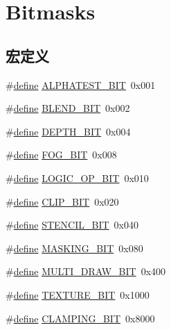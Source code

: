 \hypertarget{group___bitmasks}{}\section{Bitmasks}
\label{group___bitmasks}
\subsection*{宏定义}
\begin{DoxyCompactItemize}
\item 
\#\hyperlink{structdefine}{define} \hyperlink{group___bitmasks_ga92615fda58d9dd2b7ef1560e2be75f83}{A\+L\+P\+H\+A\+T\+E\+S\+T\+\_\+\+B\+IT}~0x001
\item 
\#\hyperlink{structdefine}{define} \hyperlink{group___bitmasks_ga75020080d440ecb465d8e2cbd7ba7e11}{B\+L\+E\+N\+D\+\_\+\+B\+IT}~0x002
\item 
\#\hyperlink{structdefine}{define} \hyperlink{group___bitmasks_gab09edfd3d45e7985cf9814658f1ab2b4}{D\+E\+P\+T\+H\+\_\+\+B\+IT}~0x004
\item 
\#\hyperlink{structdefine}{define} \hyperlink{group___bitmasks_ga5877c4822762ac53270b01b64abae8e8}{F\+O\+G\+\_\+\+B\+IT}~0x008
\item 
\#\hyperlink{structdefine}{define} \hyperlink{group___bitmasks_ga4e8030f81604a461c46f99700ffca407}{L\+O\+G\+I\+C\+\_\+\+O\+P\+\_\+\+B\+IT}~0x010
\item 
\#\hyperlink{structdefine}{define} \hyperlink{group___bitmasks_gaf936a8727f3daebdd95ba28d785e9a2c}{C\+L\+I\+P\+\_\+\+B\+IT}~0x020
\item 
\#\hyperlink{structdefine}{define} \hyperlink{group___bitmasks_ga2d518cffe05585e2dbe0f14f43c02c78}{S\+T\+E\+N\+C\+I\+L\+\_\+\+B\+IT}~0x040
\item 
\#\hyperlink{structdefine}{define} \hyperlink{group___bitmasks_gaabc7afe07f6b93a0fe97c3da1c1aad96}{M\+A\+S\+K\+I\+N\+G\+\_\+\+B\+IT}~0x080
\item 
\#\hyperlink{structdefine}{define} \hyperlink{group___bitmasks_gafa5e731a2d4a879b62b1ca7128da3637}{M\+U\+L\+T\+I\+\_\+\+D\+R\+A\+W\+\_\+\+B\+IT}~0x400
\item 
\#\hyperlink{structdefine}{define} \hyperlink{group___bitmasks_ga80c0c2a542bdc376bd1c1a1aa489eec8}{T\+E\+X\+T\+U\+R\+E\+\_\+\+B\+IT}~0x1000
\item 
\#\hyperlink{structdefine}{define} \hyperlink{group___bitmasks_ga43565c180e2466c433d6aa71bc83ac70}{C\+L\+A\+M\+P\+I\+N\+G\+\_\+\+B\+IT}~0x8000
\end{DoxyCompactItemize}


